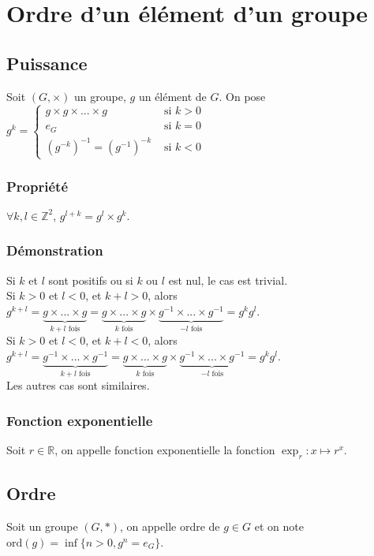 \documentclass[a4paper,10pt]{book} %
\newcommand{\R}{\mathbb{R}}
\newcommand{\Z}{\mathbb{Z}}
\newcommand{\ord}{\mathrm{ord}}
\begin{document}
\section{Ordre d'un élément d'un groupe}
\subsection{Puissance}
Soit $(G,\times)$ un groupe, $g$ un élément de $G$. On pose 
$g^k=\left\{\begin{array}{cl}
g\times g \times ... \times g &\text{ si }k>0 \\
e_G&\text{ si }k=0\\
(g^{-k})^{-1}=(g^{-1})^{-k}&\text{ si }k<0
\end{array}\right.$

\subsubsection{Propriété}
$\forall k,l\in \Z^2$, $g^{l+k}=g^l\times g^k$.

\subsubsection{Démonstration}
Si $k$ et $l$ sont positifs ou si $k$ ou $l$ est nul, le cas est trivial.\\

Si $k>0$ et $l<0$, et $k+l>0$, alors $g^{k+l}=\underset{k+l\text{ fois}}{\underbrace{g\times ...\times g}}=\underset{k\text{ fois}}{\underbrace{g\times...\times g}}\times \underset{-l\text{ fois}}{\underbrace{g^{-1}\times ...\times g^{-1}}}=g^kg^l$.\\

Si $k>0$ et $l<0$, et $k+l<0$, alors $g^{k+l}=\underset{k+l\text{ fois}}{\underbrace{g^{-1}\times ...\times g^{-1}}}=\underset{k\text{ fois}}{\underbrace{g\times...\times g}}\times \underset{-l\text{ fois}}{\underbrace{g^{-1}\times ...\times g^{-1}}}=g^kg^l$.\\

Les autres cas sont similaires.

\subsubsection{Fonction exponentielle}
Soit $r\in \R$, on appelle fonction exponentielle la fonction $\exp_r:x\mapsto r^x$.

\newpage

\subsection{Ordre}
Soit un groupe $(G,*)$, on appelle ordre de $g\in G$ et on note $\ord(g)=\inf\{n>0, g^n=e_G\}$.\\
\end{document}
